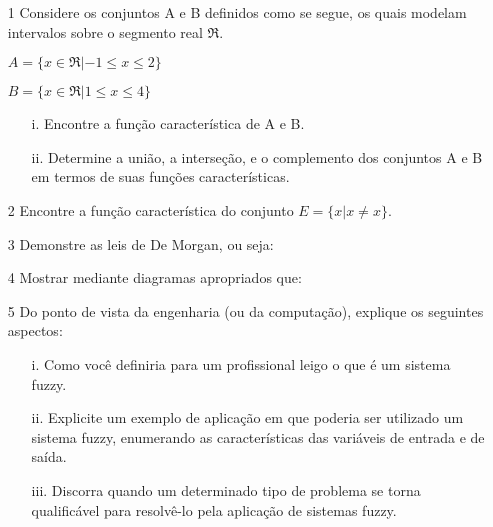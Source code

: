 \documentclass{report}
\begin{document}
\newpage

\begin{enumerate}

\item[1] Considere os conjuntos A e B definidos como se segue, os quais modelam intervalos sobre o segmento real $\Re$.

$A = \{x \in \Re | -1 \leq x \leq 2\}$

$B = \{x \in \Re |  1 \leq x \leq 4\}$ 
\begin{enumerate}
\item[i.] Encontre a função característica de A e B.

\item[ii.] Determine a união, a interseção, e o complemento dos conjuntos A e B em termos de suas funções características.
\end{enumerate}

\item[2] Encontre a função característica do conjunto $E = \{ x | x \neq x \}$.


\item[3] Demonstre as leis de De Morgan, ou seja:


\item[4] Mostrar mediante diagramas apropriados que:

\item[5] Do ponto de vista da engenharia (ou da computação), explique os seguintes aspectos:

\begin{enumerate}
\item[i.] Como você definiria para um profissional leigo o que é um sistema fuzzy.

\item[ii.] Explicite um exemplo de aplicação em que poderia ser utilizado um sistema fuzzy, 
enumerando as características das variáveis de entrada e de saída.

\item[iii.] Discorra quando um determinado tipo de problema se torna qualificável para 
resolvê-lo pela aplicação de sistemas fuzzy.
\end{enumerate}

\end{enumerate}
\end{document}
